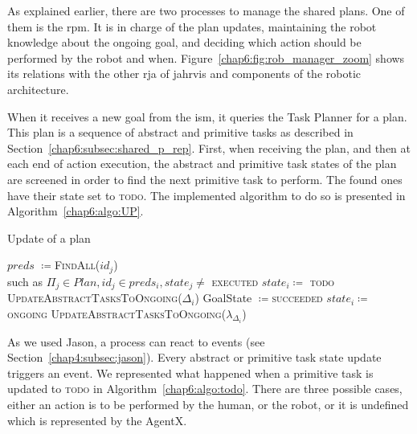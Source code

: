 \documentclass[a4paper,11pt,twoside]{StyleThese}
\begin{document}
As explained earlier, there are two processes to manage the shared plans. One of them is the \acrfull{rpm}. It is in charge of the plan updates, maintaining the robot knowledge about the ongoing goal, and deciding which action should be performed by the robot and when. Figure~\ref{chap6:fig:rob_manager_zoom} shows its relations with the other \acrshort{rja} of \acrshort{jahrvis} and components of the robotic architecture.

When it receives a new goal from the \acrlong{ism}, it queries the Task Planner for a plan. This plan is a sequence of abstract and primitive tasks as described in Section~\ref{chap6:subsec:shared_p_rep}. First, when receiving the plan, and then at each end of action execution, the abstract and primitive task states of the plan are screened in order to find the next primitive task to perform. The found ones have their state set to \textsc{todo}. The implemented algorithm to do so is presented in Algorithm~\ref{chap6:algo:UP}. 

\begin{algorithm}[!htb]
	\caption{Update of a plan}
	\label{chap6:algo:UP}
	\begin{algorithmic}
		\State $preds$ $\coloneqq$\textsc{FindAll}($id_j$) 
		\\\hfill such as $\Pi_j \in Plan, id_j \in preds_i,state_j\neq$ \textsc{executed} 
		\State $state_i\coloneqq$ \textsc{todo} 
		\State \textsc{UpdateAbstractTasksToOngoing($\Delta_i$)}
		\EndIf
		\EndFor
		\State GoalState $\coloneqq$\textsc{succeeded}
		\EndIf
		\EndFunction
		\Statex
		\State $state_i \coloneqq$ \textsc{ongoing} 
		\State \textsc{UpdateAbstractTasksToOngoing($\lambda_{\Delta_i}$)}
		\EndIf
		\EndFunction
	\end{algorithmic}
\end{algorithm}

As we used Jason, a process can react to events (see Section~\ref{chap4:subsec:jason}). Every abstract or primitive task state update triggers an event. We represented what happened when a primitive task is updated to \textsc{todo} in Algorithm~\ref{chap6:algo:todo}. There are three possible cases, either an action is to be performed by the human, or the robot, or it is undefined which is represented by the AgentX. 
\end{document}
